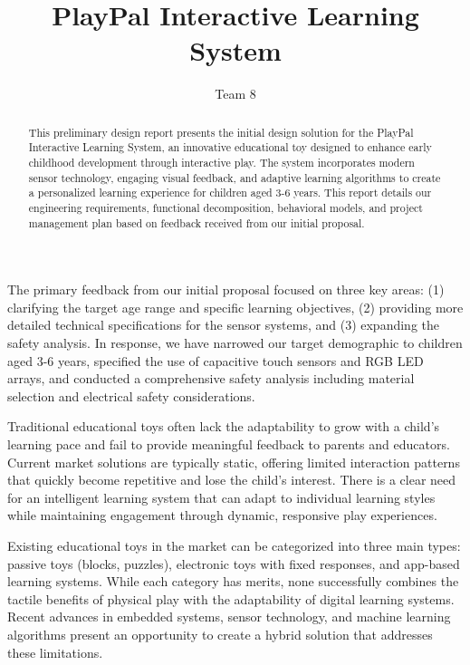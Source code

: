 \documentclass[final]{designreport}
\title{PlayPal Interactive Learning System}
\author{Team 8}
\begin{document}
\maketitle

\makefrontmatter

\begin{abstract}
This preliminary design report presents the initial design solution for the PlayPal Interactive Learning System, an innovative educational toy designed to enhance early childhood development through interactive play. The system incorporates modern sensor technology, engaging visual feedback, and adaptive learning algorithms to create a personalized learning experience for children aged 3-6 years. This report details our engineering requirements, functional decomposition, behavioral models, and project management plan based on feedback received from our initial proposal.
\end{abstract}

\commentresponse
The primary feedback from our initial proposal focused on three key areas: (1) clarifying the target age range and specific learning objectives, (2) providing more detailed technical specifications for the sensor systems, and (3) expanding the safety analysis. In response, we have narrowed our target demographic to children aged 3-6 years, specified the use of capacitive touch sensors and RGB LED arrays, and conducted a comprehensive safety analysis including material selection and electrical safety considerations.

\needsstatement
Traditional educational toys often lack the adaptability to grow with a child's learning pace and fail to provide meaningful feedback to parents and educators. Current market solutions are typically static, offering limited interaction patterns that quickly become repetitive and lose the child's interest. There is a clear need for an intelligent learning system that can adapt to individual learning styles while maintaining engagement through dynamic, responsive play experiences.

\background
Existing educational toys in the market can be categorized into three main types: passive toys (blocks, puzzles), electronic toys with fixed responses, and app-based learning systems. While each category has merits, none successfully combines the tactile benefits of physical play with the adaptability of digital learning systems. Recent advances in embedded systems, sensor technology, and machine learning algorithms present an opportunity to create a hybrid solution that addresses these limitations.
\end{document}
